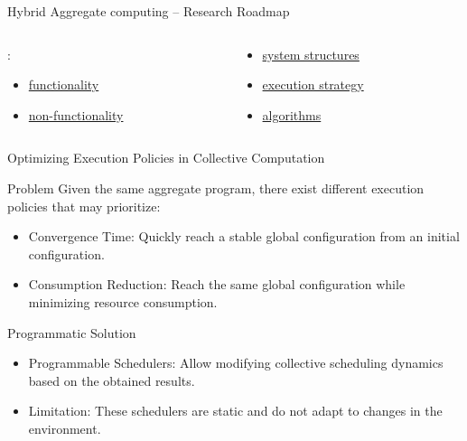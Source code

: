 \documentclass[presentation, 9pt,169]{beamer}\mode<presentation>{\usetheme{AMSBolognaFC}}
\begin{document}
\begin{frame}{Hybrid Aggregate computing -- Research Roadmap}
  \begin{columns}
    \begin{column}{0.48\textwidth}
      :
      \begin{itemize}
        \item \underline{functionality}
        \item \underline{non-functionality}
      \end{itemize}
    \end{column}
    \begin{column}{0.48\textwidth}
      \begin{itemize}
        \item \underline{system structures}
        \item \underline{execution strategy}
        \item \underline{algorithms}
      \end{itemize}
    \end{column}
  \end{columns}
  \begin{center}
  \end{center}
\end{frame}
\begin{frame}{Optimizing Execution Policies in Collective Computation}

\begin{block}{Problem}
Given the same aggregate program, there exist different execution policies that may prioritize:
\begin{itemize}
\item Convergence Time: Quickly reach a stable global configuration from an initial configuration.
\item Consumption Reduction: Reach the same global configuration while minimizing resource consumption.
\end{itemize}
\end{block}
\begin{alertblock}{Programmatic Solution}
\begin{itemize}
\item Programmable Schedulers: Allow modifying collective scheduling dynamics based on the obtained results.
\item Limitation: These schedulers are static and do not adapt to changes in the environment.
\end{itemize}
\end{alertblock}
\end{frame}
\end{document}
